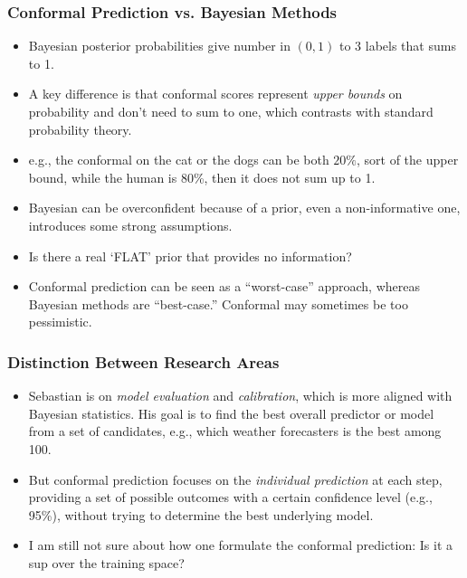 \subsubsection*{Conformal Prediction vs. Bayesian Methods}
\begin{itemize}
	\item Bayesian posterior probabilities give number in $(0,1)$ to 3 labels that sums to 1.
	\item A key difference is that conformal scores represent \emph{upper bounds} on probability and don't need to sum to one, which contrasts with standard probability theory.
	\item e.g., the conformal on the cat or the dogs can be both $20\%$, sort of the upper bound,
	      while the human is 80\%, then it does not sum up to 1.
	\item Bayesian can be overconfident because of a prior, even a non-informative one, introduces some strong assumptions.
	\item Is there a real `FLAT' prior that provides no information?
	\item Conformal prediction can be seen as a ``worst-case'' approach, whereas Bayesian methods are ``best-case.'' Conformal may sometimes be too pessimistic.
\end{itemize}

\subsubsection*{Distinction Between Research Areas}
\begin{itemize}
	\item Sebastian is on \emph{model evaluation} and \emph{calibration}, which is more aligned with Bayesian statistics. His goal is to find the best overall predictor or model from a set of candidates, e.g., which weather forecasters is the best among 100.
	\item But conformal prediction focuses on the \emph{individual prediction} at each step, providing a set of possible outcomes with a certain confidence level (e.g., 95\%), without trying to determine the best underlying model.
	\item I am still not sure about how one formulate the conformal prediction:
	      Is it a sup over the training space?
\end{itemize}

